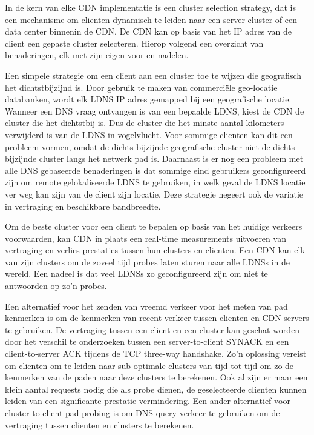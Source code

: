 
In de kern van elke CDN implementatie is een cluster selection strategy, dat is een mechanisme om clienten dynamisch te leiden naar een server cluster of een data center binnenin de CDN. De CDN kan op basis van het IP adres van de client een gepaste cluster selecteren.
Hierop volgend een overzicht van benaderingen, elk met zijn eigen voor en nadelen.

\noindent Een simpele strategie om een client aan een cluster toe te wijzen die geografisch het dichtstbijzijnd is. Door gebruik te maken van commerciële geo-locatie databanken, wordt elk LDNS IP adres gemapped bij een geografische locatie. Wanneer een DNS vraag ontvangen is van een bepaalde LDNS, kiest de CDN de cluster die het dichtstbij is. Dus de cluster die het minste aantal kilometers verwijderd is van de LDNS in vogelvlucht.
Voor sommige clienten kan dit een probleem vormen, omdat de dichts bijzijnde geografische cluster niet de dichts bijzijnde cluster langs het netwerk pad is. Daarnaast is er nog een probleem met alle DNS gebaseerde benaderingen is dat sommige eind gebruikers geconfigureerd zijn om remote gelokaliseerde LDNS te gebruiken, in welk geval de LDNS locatie ver weg kan zijn van de client zijn locatie. Deze strategie negeert ook de variatie in vertraging en beschikbare bandbreedte.

\noindent Om de beste cluster voor een client te bepalen op basis van het huidige verkeers voorwaarden, kan CDN in plaats een real-time measurements uitvoeren van vertraging en verlies prestaties tussen hun clusters en clienten. Een CDN kan elk van zijn clusters om de zoveel tijd probes laten sturen naar alle LDNSs in de wereld. Een nadeel is dat veel LDNSs zo geconfigureerd zijn om niet te antwoorden op zo’n probes.

\noindent Een alternatief voor het zenden van vreemd verkeer voor het meten van pad kenmerken is om de kenmerken van recent verkeer tussen clienten en CDN servers te gebruiken. De vertraging tussen een client en een cluster kan geschat worden door het verschil te onderzoeken tussen een server-to-client SYNACK en een client-to-server ACK tijdens de TCP three-way handshake. Zo’n oplossing vereist om clienten om te leiden naar sub-optimale clusters van tijd tot tijd om zo de kenmerken van de paden naar deze clusters te berekenen. Ook al zijn er maar een klein aantal requests nodig die als probe dienen, de geselecteerde clienten kunnen leiden van een significante prestatie vermindering.
Een ander alternatief voor cluster-to-client pad probing is om DNS query verkeer te gebruiken om de vertraging tussen clienten en clusters te berekenen.

